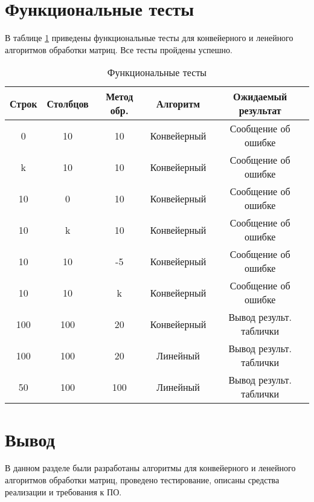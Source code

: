 \section{Функциональные тесты}

В таблице \ref{tbl:functional_test} приведены функциональные тесты для конвейерного и ленейного алгоритмов обработки матриц. Все тесты пройдены успешно.

\begin{table}[h]
	\begin{center}
		\captionsetup{justification=raggedright,singlelinecheck=off}
		\caption{\label{tbl:functional_test} Функциональные тесты}
		\begin{tabular}{|c|c|c|c|c|}
			\hline
			Строк & Столбцов & Метод обр. & Алгоритм & Ожидаемый результат 
			\\ \hline
			0 & 10 & 10 & Конвейерный & Сообщение об ошибке 
			\\ \hline
			k & 10 & 10 & Конвейерный & Сообщение об ошибке 
			\\ \hline
			10 & 0 & 10 & Конвейерный & Сообщение об ошибке 
			\\ \hline
			10 & k & 10 & Конвейерный & Сообщение об ошибке 
			\\ \hline
			10 & 10 & -5 & Конвейерный & Сообщение об ошибке 
			\\ \hline
			10 & 10 & k & Конвейерный & Сообщение об ошибке 
			\\ \hline
			100 & 100 & 20 & Конвейерный & Вывод результ. таблички
			\\ \hline
			100 & 100 & 20 & Линейный & Вывод результ. таблички
			\\ \hline
			50 & 100 & 100 & Линейный & Вывод результ. таблички
			\\ \hline
		\end{tabular}
	\end{center}
\end{table}

\section{Вывод}

В данном разделе были разработаны алгоритмы для конвейерного и ленейного алгоритмов обработки матриц, проведено тестирование, описаны средства реализации и требования к ПО.

